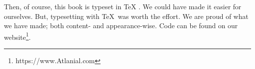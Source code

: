 Then, of course, this book is typeset in \TeX{} . We could have made it easier for ourselves. But, typesetting with \TeX{}\ was worth the effort. We are proud of what we have made; both content- and appearance-wise. Code can be found on our website\footnote{https://www.Atlanial.com}.    


\vfill
